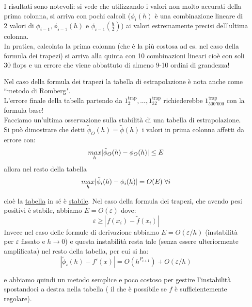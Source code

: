 \documentclass[12pt,a4paper]{article}
\DeclarePairedDelimiter{\abs}{\lvert}{\rvert}
\begin{document}
I risultati sono notevoli: si vede che utilizzando i valori non molto accurati della prima colonna, si arriva con pochi calcoli ($\phi_i(h)$ è una combinazione lineare di 2 valori di $\phi_{i-1},\phi_{i-1}(h)$ e $\phi_{i-1}(\frac{h}{2})$) ai valori estremamente precisi dell'ultima colonna.\\In pratica, calcolata la prima colonna (che è la più costosa ad es. nel caso della formula dei trapezi) si arriva alla quinta con 10 combinazioni lineari cioè con soli 30 flops e un errore che viene abbattuto di almeno 9-10 ordini di grandezza!

Nel caso della formula dei trapezi la tabella di estrapolazione è nota anche come ``metodo di Romberg".\\
L'errore finale della tabella partendo da $1_2^{\text{trap}},...,1_{32}^{\text{trap}}$ richiederebbe $1_{500'000}^{\text{trap}}$ con la formula base!\\
Facciamo un'ultima osservazione sulla stabilità di una tabella di estrapolazione.\\
Si può dimostrare che detti $\tilde{\phi}_O(h)=\tilde{\phi}(h)$ i valori in prima colonna affetti da errore con:
\begin{equation*}
    \underset{h}{max} \abs{\tilde{\phi}_O(h)-\phi_O(h)} \leq E
\end{equation*}
allora nel resto della tabella 
\begin{equation*}
    \underset{h}{max} \abs{\tilde{\phi}_i(h)-\phi_i(h)} = O(E) \; \forall i 
\end{equation*}

cioè la \uline{tabella} in sé è \uline{stabile}.
Nel caso della formula dei trapezi, che avendo pesi positivi è stabile, abbiamo $E=O(\varepsilon)$ dove:
\begin{equation*}
    \varepsilon \geq |f(x_i)-\tilde{f}(x_i)|
\end{equation*}
Invece nel caso delle formule di derivazione abbiamo $E=O(\varepsilon/h)$ (instabilità per $\varepsilon$ fissato e $h\rightarrow 0$) e questa instabilità resta tale (senza essere ulteriormente amplificata) nel resto della tabella, per cui si ha:
\begin{equation*}
    |\tilde{\phi}_i(h)-f'(x)|=O(h^{P_{i+1}})+O(\varepsilon/h)
\end{equation*}

e abbiamo quindi un metodo semplice e poco costoso per gestire l'instabilità spostandoci a destra nella tabella ( il che è possibile se $f$ è sufficientemente regolare).
\end{document}

